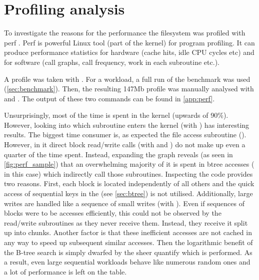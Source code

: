     \section{Profiling analysis}
        \label{sec:perf}

        To investigate the reasons for the performance the filesystem was
        profiled with perf \cite{perf}. Perf is powerful Linux tool (part of
        the kernel) for program profiling. It can produce performance
        statistics for hardware (cache hits, idle CPU cycles etc) and for
        software (call graphs, call frequency, work in each subroutine etc.).

        A profile was taken with . For a
        workload, a full run of the benchmark was used (\autoref{sec:benchmark}).
        Then, the resulting 147Mb profile was manually analysed with
         and . The output of these two commands can be found in
        \autoref{app:perf}.

        Unsurprisingly, most of the time is spent in the kernel (upwards of
        90\%). However, looking into which subroutine enters the kernel (with
        ) has interesting results. The biggest time
        consumer is, as expected the file access subroutine
        (). However, in it direct block
        read/write calls (with  and
        ) do not make up even a quarter of the time
        spent. Instead, expanding the graph reveals (as seen in
        \autoref{fig:perf_sample}) that an overwhelming majority of it is spent in btree
        accesses ( in this case) which indirectly
        call those subroutines. Inspecting the code provides two reasons.
        First, each block is located independently of all others and the quick
        access of sequential keys in the \bplustree (see \autoref{sec:btree}) is
        not utilised. Additionally, large writes are handled like a sequence of
        small writes (with ). Even if
        sequences of blocks were to be accesses efficiently, this could not be
        observed by the read/write subroutines as they never receive them.
        Instead, they receive it split up into chunks. Another factor is that
        these inefficient accesses are not cached in any way to speed up
        subsequent similar accesses. Then the logarithmic benefit of the B-tree
        search is simply dwarfed by the sheer quantify which is performed. As a
        result, even large sequential workloads behave like numerous random
        ones and a lot of performance is left on the table.

